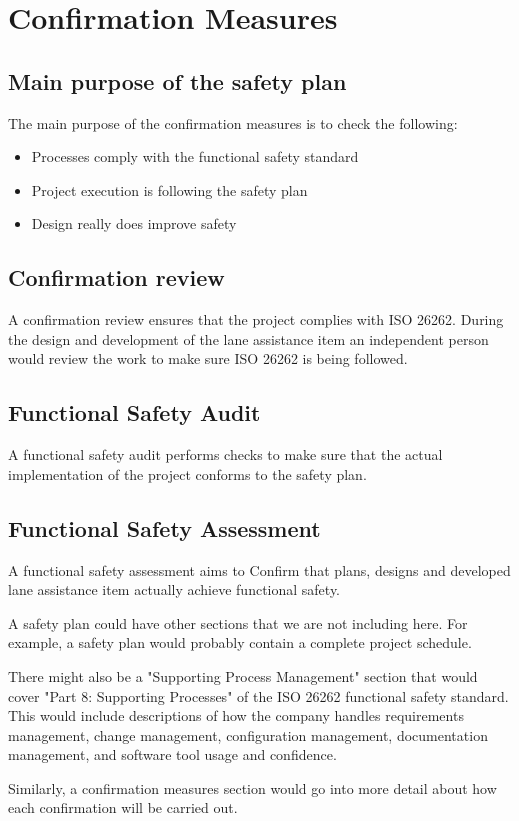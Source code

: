 \chapter{Confirmation Measures}
\label{ch:confirmation_measures}

\section{Main purpose of the safety plan}

The main purpose of the confirmation measures is to check the following:
\begin{itemize}
  \item Processes comply with the functional safety standard
  \item Project execution is following the safety plan
  \item Design really does improve safety
\end{itemize}


\section{Confirmation review}

A confirmation review ensures that the project complies with ISO 26262. 
During the design and development of the lane assistance item an independent
person would review the work to make sure ISO 26262 is being followed.

\section{Functional Safety Audit}

A functional safety audit performs checks to make sure that the actual
implementation of the project conforms to the safety plan.

\section{Functional Safety Assessment}

A functional safety assessment aims to Confirm that plans, designs and
developed lane assistance item actually achieve functional safety.

\vspace{2cm}

A safety plan could have other sections that we are not including here. For
example, a safety plan would probably contain a complete project schedule.

There might also be a "Supporting Process Management" section that would cover
"Part 8: Supporting Processes" of the ISO 26262 functional safety standard.
This would include descriptions of how the company handles requirements
management, change management, configuration management, documentation
management, and software tool usage and confidence.

Similarly, a confirmation measures section would go into more detail about how
each confirmation will be carried out.
